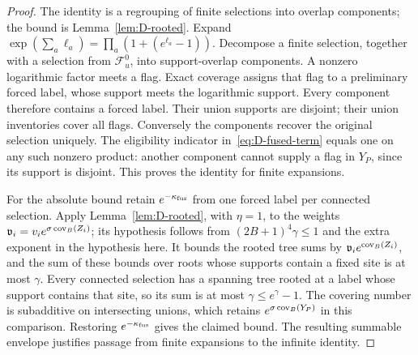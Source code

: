 \begin{proof}
The identity is a regrouping of finite selections into overlap components; the bound is Lemma~\ref{lem:D-rooted}. Expand $\exp(\sum_a\ell_a)=\prod_a(1+(e^{\ell_a}-1))$. Decompose a finite selection, together with a selection from $\mathcal F_u^0$, into support-overlap components. A nonzero logarithmic factor meets a flag. Exact coverage assigns that flag to a preliminary forced label, whose support meets the logarithmic support. Every component therefore contains a forced label. Their union supports are disjoint; their union inventories cover all flags. Conversely the components recover the original selection uniquely. The eligibility indicator in~\eqref{eq:D-fused-term} equals one on any such nonzero product: another component cannot supply a flag in $Y_P$, since its support is disjoint. This proves the identity for finite expansions.

For the absolute bound retain $e^{-\kappa_{\rm fus}}$ from one forced label per connected selection. Apply Lemma~\ref{lem:D-rooted}, with $\eta=1$, to the weights $\mathfrak v_i=v_ie^{\sigma\operatorname{cov}_B(Z_i)}$; its hypothesis follows from $(2B+1)^4\gamma\le1$ and the extra exponent in the hypothesis here. It bounds the rooted tree sums by $\mathfrak v_ie^{\operatorname{cov}_B(Z_i)}$, and the sum of these bounds over roots whose supports contain a fixed site is at most $\gamma$. Every connected selection has a spanning tree rooted at a label whose support contains that site, so its sum is at most $\gamma\le e^\gamma-1$. The covering number is subadditive on intersecting unions, which retains $e^{\sigma\operatorname{cov}_B(Y_P)}$ in this comparison. Restoring $e^{-\kappa_{\rm fus}}$ gives the claimed bound. The resulting summable envelope justifies passage from finite expansions to the infinite identity.
\end{proof}

